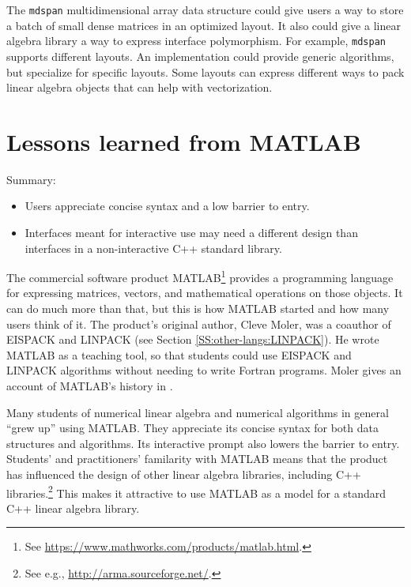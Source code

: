The \texttt{mdspan} \cite{P0009r8} multidimensional array data
structure could give users a way to store a batch of small dense
matrices in an optimized layout.  It also could give a linear algebra
library a way to express interface polymorphism.  For example,
\texttt{mdspan} supports different layouts.  An implementation could
provide generic algorithms, but specialize for specific layouts.  Some
layouts can express different ways to pack linear algebra objects that
can help with vectorization.

\section{Lessons learned from MATLAB}
\label{S:Matlab}

Summary:
\begin{itemize}
\item Users appreciate concise syntax and a low barrier to entry.
\item Interfaces meant for interactive use may need a different design
  than interfaces in a non-interactive C++ standard library.
\end{itemize}

The commercial software product MATLAB\footnote{See
  \url{https://www.mathworks.com/products/matlab.html}.} provides a
programming language for expressing matrices, vectors, and
mathematical operations on those objects.  It can do much more than
that, but this is how MATLAB started and how many users think of it.
The product's original author, Cleve Moler, was a coauthor of EISPACK
and LINPACK (see Section \ref{SS:other-langs:LINPACK}).  He wrote
MATLAB as a teaching tool, so that students could use EISPACK and
LINPACK algorithms without needing to write Fortran programs.  Moler
gives an account of MATLAB's history in \cite{moler2004origins}.

Many students of numerical linear algebra and numerical algorithms in
general ``grew up'' using MATLAB.  They appreciate its concise syntax
for both data structures and algorithms.  Its interactive prompt also
lowers the barrier to entry.  Students' and practitioners' familarity
with MATLAB means that the product has influenced the design of other
linear algebra libraries, including C++ libraries.\footnote{See e.g.,
  \url{http://arma.sourceforge.net/}.}  This makes it attractive to
use MATLAB as a model for a standard C++ linear algebra library.


